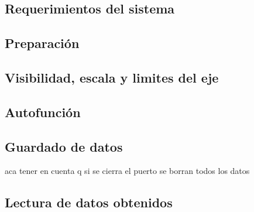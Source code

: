 \subsection{Requerimientos del sistema}

\subsection{Preparación}

\subsection{Visibilidad, escala y limites del eje}

\subsection{Autofunción}

\subsection{Guardado de datos}
aca tener en cuenta q si se cierra el puerto se borran todos los datos


\subsection{Lectura de datos obtenidos}